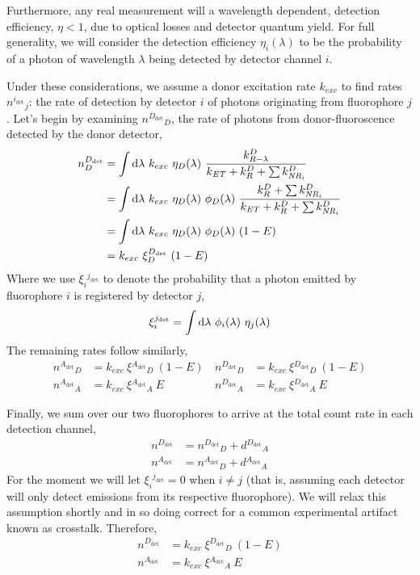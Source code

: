 \documentclass{article}
\newcommand{\dt}[1]{\ensuremath{^{#1_\mathrm{det}}}}   %
\newcommand{\NR}{\ensuremath{\mathit{NR}}}          %
\newcommand{\ET}{\ensuremath{\mathit{ET}}}          %
\begin{document}
Furthermore, any real measurement will a wavelength dependent,
detection efficiency, $\eta < 1$, due to optical losses and detector
quantum yield. For full generality, we will consider the detection
efficiency $\eta_i(\lambda)$ to be the probability of a photon of
wavelength $\lambda$ being detected by detector channel $i$.

Under these considerations, we assume a donor excitation rate
$k_{exc}$ to find rates $n\dt{i}_j$: the rate of detection by
detector $i$ of photons originating from fluorophore $j$. Let's begin
by examining $n\dt{D}_D$, the rate of photons from donor-fluoroscence
detected by the donor detector,
\begin{align*}
  n\dt{D}_D
  & = \int \dif\lambda ~ k_{exc} ~ \eta_D(\lambda) ~ \frac{k^D_{R-\lambda}}{k_\ET + k^D_R + \sum k^D_{\NR_i}} \\
  & = \int \dif\lambda ~ k_{exc} ~ \eta_D(\lambda) ~ \phi_D(\lambda) ~
         \frac{k^D_R + \sum k^D_{\NR_i}}{k_\ET + k^D_R + \sum k^D_{\NR_i}} \\
  & = \int \dif\lambda ~ k_{exc} ~ \eta_D(\lambda) ~ \phi_D(\lambda) ~ (1 - E) \\
  & = k_{exc} ~ \xi\dt{D}_D ~ (1 - E)
\end{align*}
Where we use $\xi_i\dt{j}$ to denote the probability that a photon
emitted by fluorophore $i$ is registered by detector $j$,
\[ \xi_i\dt{j} = \int \dif\lambda ~ \phi_i(\lambda) ~ \eta_j(\lambda) \]
%
The remaining rates follow similarly,
\begin{align*}
  n\dt{A}_D & = k_{exc} ~ \xi\dt{A}_D ~ (1 - E) \, &
  n\dt{D}_D & = k_{exc} ~ \xi\dt{D}_D ~ (1 - E) \\
  n\dt{A}_A & = k_{exc} ~ \xi\dt{A}_A ~ E \, &
  n\dt{D}_A & = k_{exc} ~ \xi\dt{D}_A ~ E
\end{align*}

Finally, we sum over our two fluorophores to arrive at the total count
rate in each detection channel,
\begin{align*}
  n\dt{D} & = n\dt{D}_D + d\dt{D}_A \\
  n\dt{A} & = n\dt{A}_D + d\dt{A}_A
\end{align*}
For the moment we will let $\xi_i\dt{j} = 0$ when $i \ne j$ (that is,
assuming each detector will only detect emissions from its respective
fluorophore). We will relax this assumption shortly and in so doing
correct for a common experimental artifact known as crosstalk. Therefore,
\begin{align*}
  n\dt{D} & = k_{exc} ~ \xi\dt{D}_D ~ (1 - E) \\
  n\dt{A} & = k_{exc} ~ \xi\dt{A}_A ~ E
\end{align*}
\end{document}
